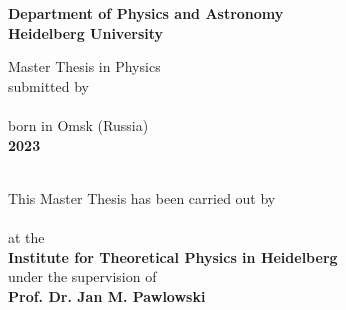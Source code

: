 {\hypersetup{allcolors=black}
\begin{titlepage}

	\begin{center}
		\makeatletter
		\vspace{2cm}
		\Large\textbf{Department of Physics and Astronomy\\
			Heidelberg University}
		
		\vfill
		\normalsize
		Master Thesis in Physics\\
		\normalsize
		submitted by\\[0.4cm]
		\Large
		\textbf{\href{mailto:eugen9898@web.de}{\@author}}\\[0.4cm]
		\normalsize
		born in Omsk (Russia)\\[0.4cm]
		\Large
		\textbf{2023}
		
        \thispagestyle{empty}
		\cleardoublepage
		\thispagestyle{empty}
		\LARGE\textbf{\@title}\\[.4cm]

		\vfill
		\normalsize
		This Master Thesis has been carried out by \\ 
		\vspace{3pt}
		\textbf{\href{mailto:eugen9898@web.de}{\@author}}  \\ 
		\vspace{3pt}
		at the\\
		\vspace{3pt}
		\textbf{Institute for Theoretical Physics in Heidelberg}\\
		\vspace{5pt}
		under the supervision of\\
		\vspace{5pt}
		\textbf{Prof. Dr. Jan M. Pawlowski} 
		
		\makeatother
	\end{center}
\cleardoublepage
\end{titlepage}
}